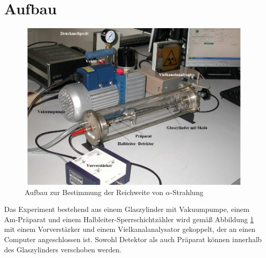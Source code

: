 \section{Aufbau}
\label{sec:Aufbau}

\begin{figure}
\centering
\includegraphics[scale=0.6]{content/images/aufbau.jpg}
\caption{Aufbau zur Bestimmung der Reichweite von $\alpha$-Strahlung\cite{V701}}
\label{fig:aufbau}
\end{figure}

\noindent Das Experiment bestehend aus einem Glaszylinder mit Vakuumpumpe, einem Am-Präparat und einem Halbleiter-Sperrschichtzähler wird gemäß Abbildung \ref{fig:aufbau} mit einem Vorverstärker und einem Vielkanalanalysator gekoppelt, der an einen Computer angeschlossen ist.
Sowohl Detektor als auch Präparat können innerhalb des Glaszylinders verschoben werden.

